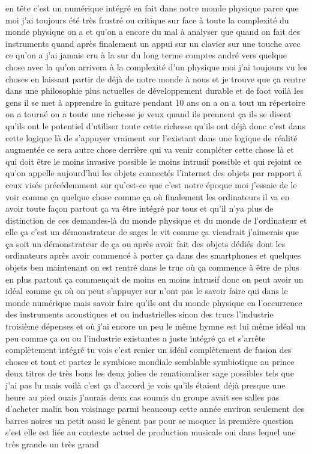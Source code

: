  en tête c'est un numérique intégré en fait dans notre monde physique parce que moi j'ai toujours été très frustré ou critique sur face à toute la complexité du monde physique on a et qu'on a encore du mal à analyser que quand on fait des instruments quand après finalement un appui sur un clavier sur une touche avec ce qu'on a j'ai jamais cru à la sur du long terme comptes andré vers quelque chose avec la qu'on arrivera à la complexité d'un physique moi j'ai toujours vu les choses en laissant partir de déjà de notre monde à nous et je trouve que ça rentre dans une philosophie plus actuelles de développement durable et de foot voilà les gens il se met à apprendre la guitare pendant 10 ans on a on a tout un répertoire on a tourné on a toute une richesse je veux quand ils prennent ça ils se disent qu'ils ont le potentiel d'utiliser toute cette richesse qu'ils ont déjà donc c'est dans cette logique là de s'appuyer vraiment sur l'existant dans une logique de réalité augmentée ce sera autre chose derrière qui va venir compléter cette chose là et qui doit être le moins invasive possible le moins intrusif possible et qui rejoint ce qu'on appelle aujourd'hui les objets connectés l'internet des objets par rapport à ceux visés précédemment sur qu'est-ce que c'est notre époque moi j'essaie de le voir comme ça quelque chose comme ça où finalement les ordinateurs il va en avoir toute façon partout ça va être intégré par tous et qu'il n'ya plus de distinction de ces demandes-là du monde physique et du monde de l'ordinateur et elle ça c'est un démonstrateur de sages le vit comme ça viendrait j'aimerais que ça soit un démonstrateur de ça ou après avoir fait des objets dédiés dont les ordinateurs après avoir commencé à porter ça dans des smartphones et quelques objets ben maintenant on est rentré dans le truc où ça commence à être de plus en plus partout ça commençait de moins en moins intrusif donc on peut avoir un idéal comme ça où on peut s'appuyer sur n'ont pas le savoir faire qui dans le monde numérique mais savoir faire qu'ils ont du monde physique en l'occurrence des instruments acoustiques et ou industrielles sinon des trucs l'industrie troisième dépenses et où j'ai encore un peu le même hymne est lui même idéal un peu comme ça ou ou l'industrie existantes a juste intégré ça et s'arrête complètement intégré tu vois c'est renier un idéal complètement de fusion des choses et tout et partez le symbiose mondiale semblable symbiotique au prince deux titres de très bons les deux jolies de renationaliser sage possibles tels que j'ai pas lu mais voilà c'est ça d'accord je vois qu'ils étaient déjà presque une heure au pied ouais j'aurais deux cas soumis du groupe avait ses salles pas d'acheter malin bon voisinage parmi beaucoup cette année environ seulement des barres noires un petit aussi le gênent pas pour se moquer la première question s'est elle est liée au contexte actuel de production musicale oui dans lequel une très grande un très grand 
